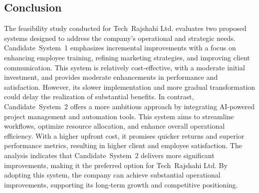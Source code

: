 \documentclass[12pt,a4paper]{article}
\begin{document}
\newpage
\subsection{Conclusion}
The feasibility study conducted for Tech Rajshahi Ltd. evaluates two proposed systems designed to address the company’s operational and strategic needs.  Candidate System 1 emphasizes incremental improvements with a focus on enhancing employee training, refining marketing strategies, and improving client communication.  This system is relatively cost‑effective, with a moderate initial investment, and provides moderate enhancements in performance and satisfaction.  However, its slower implementation and more gradual transformation could delay the realization of substantial benefits.  In contrast, Candidate System 2 offers a more ambitious approach by integrating AI‑powered project management and automation tools.  This system aims to streamline workflows, optimize resource allocation, and enhance overall operational efficiency.  With a higher upfront cost, it promises quicker returns and superior performance metrics, resulting in higher client and employee satisfaction.  The analysis indicates that Candidate System 2 delivers more significant improvements, making it the preferred option for Tech Rajshahi Ltd.  By adopting this system, the company can achieve substantial operational improvements, supporting its long‑term growth and competitive positioning.
\end{document}
